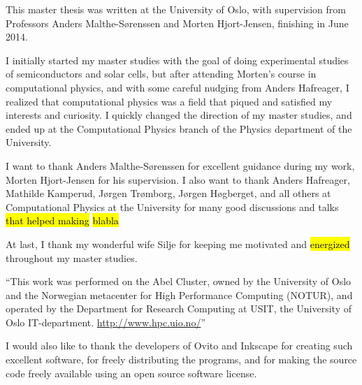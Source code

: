 \begin{acknowledgements}
This master thesis was written at the University of Oslo, with supervision from Professors Anders Malthe-Sørenssen and Morten Hjort-Jensen, finishing in June 2014.

I initially started my master studies with the goal of doing experimental studies of semiconductors and solar cells, but after attending Morten's course in computational physics, and with some careful nudging from Anders Hafreager, I realized that computational physics was a field that piqued and satisfied my interests and curiosity. I quickly changed the direction of my master studies, and ended up at the Computational Physics branch of the Physics department of the University.

I want to thank Anders Malthe-Sørenssen for excellent guidance during my work, Morten Hjort-Jensen for his supervision. I also want to thank Anders Hafreager, Mathilde Kamperud, Jørgen Trømborg, Jørgen Høgberget, and all others at Computational Physics at the University for many good discussions and talks \hl{that helped making } \hl{blabla}

At last, I thank my wonderful wife Silje for keeping me motivated and \hl{energized} throughout my master studies.

``This work was performed on the Abel Cluster, owned by the University of Oslo and the Norwegian metacenter for High Performance Computing (NOTUR), and operated by the Department for Research Computing at USIT, the University of Oslo IT-department. \url{http://www.hpc.uio.no/}'' 

I would also like to thank the developers of Ovito\cite{stukowski2010ovito} and Inkscape\cite{webinkscape} for creating such excellent software, for freely distributing the programs, and for making the source code freely available using an open source software license.

\end{acknowledgements}
